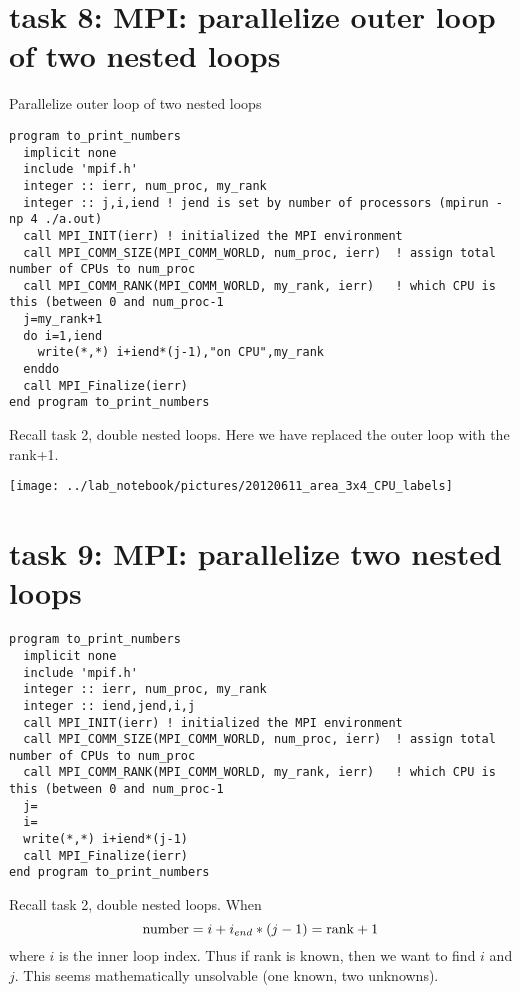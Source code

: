 \documentclass[12pt]{report}
\begin{document}


\section{task 8: MPI: parallelize outer loop of two nested loops}
Parallelize outer loop of two nested loops
\begin{verbatim}
program to_print_numbers
  implicit none
  include 'mpif.h'
  integer :: ierr, num_proc, my_rank  
  integer :: j,i,iend ! jend is set by number of processors (mpirun -np 4 ./a.out)
  call MPI_INIT(ierr) ! initialized the MPI environment
  call MPI_COMM_SIZE(MPI_COMM_WORLD, num_proc, ierr)  ! assign total number of CPUs to num_proc
  call MPI_COMM_RANK(MPI_COMM_WORLD, my_rank, ierr)   ! which CPU is this (between 0 and num_proc-1
  j=my_rank+1
  do i=1,iend
    write(*,*) i+iend*(j-1),"on CPU",my_rank
  enddo
  call MPI_Finalize(ierr)
end program to_print_numbers   
\end{verbatim}
Recall task 2, double nested loops. Here we have replaced the outer loop with the rank+1.
\begin{center}
 \texttt{[image: ../lab\_notebook/pictures/20120611\_area\_3x4\_CPU\_labels]}
\end{center}


\section{task 9: MPI: parallelize two nested loops}
\begin{verbatim}
program to_print_numbers
  implicit none
  include 'mpif.h'
  integer :: ierr, num_proc, my_rank  
  integer :: iend,jend,i,j
  call MPI_INIT(ierr) ! initialized the MPI environment
  call MPI_COMM_SIZE(MPI_COMM_WORLD, num_proc, ierr)  ! assign total number of CPUs to num_proc
  call MPI_COMM_RANK(MPI_COMM_WORLD, my_rank, ierr)   ! which CPU is this (between 0 and num_proc-1
  j=
  i=
  write(*,*) i+iend*(j-1)
  call MPI_Finalize(ierr)
end program to_print_numbers   
\end{verbatim}
Recall task 2, double nested loops. When 
\begin{equation}
 {\rm number} = i+i_{end}*(j-1) = {\rm rank}+1
\end{equation}
where $i$ is the inner loop index. Thus if rank is known, then we want to find $i$ and $j$. This seems mathematically unsolvable (one known, two unknowns). 
\end{document}
